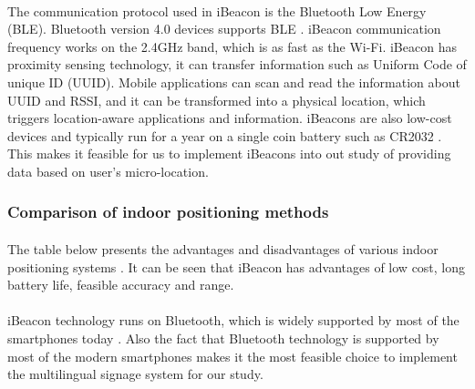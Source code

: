 \documentclass[12pt]{article}
\begin{document}
\paragraph{}The communication protocol used in iBeacon is the Bluetooth Low Energy (BLE). Bluetooth version 4.0 devices supports BLE \cite{indoor}. iBeacon communication frequency works on the 2.4GHz band, which is as fast as the Wi-Fi. iBeacon has proximity sensing technology, it can transfer information such as Uniform Code of unique ID (UUID). Mobile applications can scan and read the information about UUID and RSSI, and it can be transformed into a physical location, which triggers location-aware applications and information. iBeacons are also low-cost devices and typically run for a year on a single coin battery such as CR2032 \cite{audioBeacon}. This makes it feasible for us to implement iBeacons into out study of providing data based on user's micro-location.

\subsubsection{Comparison of indoor positioning methods}
\paragraph{} The table below presents the advantages and disadvantages of various indoor positioning systems \cite{sensing}. It can be seen that iBeacon has advantages of low cost, long battery life, feasible accuracy and range. %

\paragraph{} iBeacon technology runs on Bluetooth, which is widely supported by most of the smartphones today \cite{audioBeacon}. Also the fact that Bluetooth technology is supported by most of the modern smartphones \cite{indoor} makes it the most feasible choice to implement the multilingual signage system for our study.
 
\end{document}
